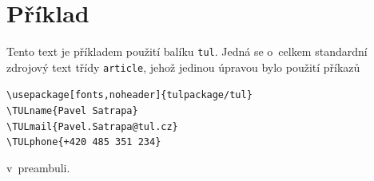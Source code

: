 \documentclass[a4paper,12pt,fonts,numbering,listingsleft]{./tulpackage/tularticle}
\newcommand{\cmdfont}[1]{\texttt{\color{\tulcolor}#1}}
\newcommand{\cmdnoindex}[1]{\cmdfont{\textbackslash{}#1}}
\begin{document}
\section{Příklad}

Tento text je příkladem použití balíku \cmdfont{tul}. Jedná se o~celkem
standardní zdrojový text třídy \cmdfont{article}, jehož jedinou úpravou bylo
použití příkazů

\begin{listing}
    \cmdnoindex{usepackage[fonts,noheader]\{tulpackage/tul\}}\\
    \cmdnoindex{TULname\{Pavel Satrapa\}}\\
    \cmdnoindex{TULmail\{Pavel.Satrapa@tul.cz\}}\\
    \cmdnoindex{TULphone\{+420\,485\,351\,234\}}
\end{listing}

v~preambuli.


\renewcommand{\indexname}{Přehled příkazů}
\printindex
\end{document}
